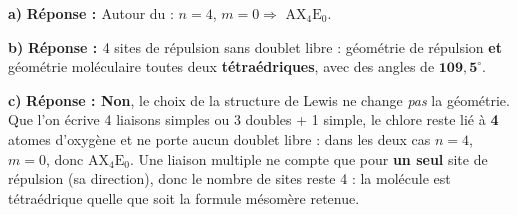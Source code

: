 \documentclass[11pt,a4paper]{article}
\newcommand{\ball}[5]{\shade[ball color=#2] (#1) circle (#3);\node[font=\footnotesize\bfseries,text=#4] at (#1){#5};}
\newcommand{\pbond}[2]{\draw[bondcol,line width=1.6pt] (#1)--(#2);}
\newcommand{\wbond}[2]{\draw[bondcol,fill=bondcol,draw=none] let \p1=($(#2)-(#1)$), \n1={atan2(\y1,\x1)} in (#1) -- ($(#2)+(\n1+90:0.12)$) -- ($(#2)+(\n1-90:0.12)$) -- cycle;}
\newcommand{\hbond}[2]{\draw[bondcol,line width=1pt,dash pattern=on 1.4pt off 1.8pt] (#1)--(#2);}
\newcommand{\AX}[2]{\ensuremath{\mathrm{AX_{#1}E_{#2}}}}
\newcommand{\rep}{\textbf{\textcolor{corcol}{Réponse : }}}
\begin{document}
\begin{cor}
\textbf{a)} \rep Autour du  : $n=4$, $m=0 \Rightarrow$ \AX{4}{0}.\par
\textbf{b)} \rep 4 sites de répulsion sans doublet libre : géométrie de répulsion \textbf{et}
géométrie moléculaire toutes deux \textbf{tétraédriques}, avec des angles  de
$\mathbf{109{,}5^\circ}$.\par
\textbf{c)} \rep \textbf{Non}, le choix de la structure de Lewis ne change \emph{pas} la géométrie.
Que l'on écrive 4 liaisons simples ou 3 doubles + 1 simple, le chlore reste lié à \textbf{4}
atomes d'oxygène et ne porte aucun doublet libre : dans les deux cas $n=4$, $m=0$, donc \AX{4}{0}.
Une liaison multiple ne compte que pour \textbf{un seul} site de répulsion (sa direction), donc le
nombre de sites reste 4 : la molécule est tétraédrique quelle que soit la formule mésomère
retenue.
\begin{center}
\end{center}
\end{cor}
\end{document}
